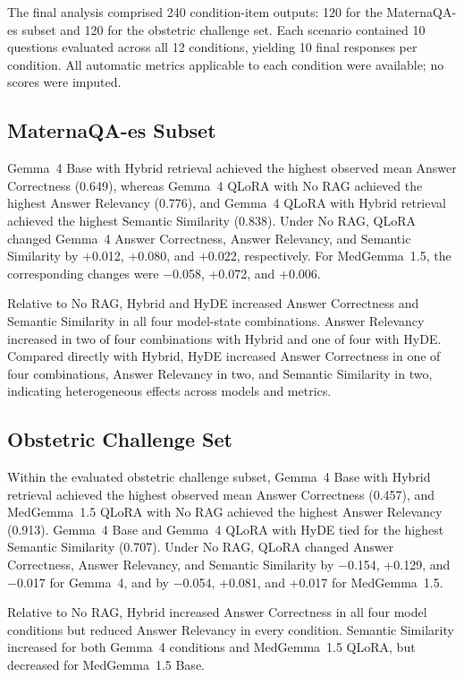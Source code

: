 The final analysis comprised 240 condition-item outputs: 120 for the
MaternaQA-es subset and 120 for the obstetric challenge set. Each scenario
contained 10 questions evaluated across all 12 conditions, yielding 10 final
responses per condition. All automatic metrics applicable to each condition
were available; no scores were imputed.

\subsection{MaternaQA-es Subset}
Gemma~4 Base with Hybrid retrieval achieved the highest observed mean Answer
Correctness (0.649), whereas Gemma~4 QLoRA with No RAG achieved the highest
Answer Relevancy (0.776), and Gemma~4 QLoRA with Hybrid retrieval achieved the
highest Semantic Similarity (0.838). Under No RAG, QLoRA changed Gemma~4
Answer Correctness, Answer Relevancy, and Semantic Similarity by +0.012,
+0.080, and +0.022, respectively. For MedGemma~1.5, the corresponding changes
were $-$0.058, +0.072, and +0.006.

Relative to No RAG, Hybrid and HyDE increased Answer Correctness and Semantic
Similarity in all four model-state combinations. Answer Relevancy increased
in two of four combinations with Hybrid and one of four with HyDE. Compared
directly with Hybrid, HyDE increased Answer Correctness in one of four
combinations, Answer Relevancy in two, and Semantic Similarity in two,
indicating heterogeneous effects across models and metrics.

\subsection{Obstetric Challenge Set}
Within the evaluated obstetric challenge subset, Gemma~4 Base with Hybrid
retrieval achieved the highest observed mean Answer Correctness (0.457), and
MedGemma~1.5 QLoRA with No RAG achieved the highest Answer Relevancy (0.913).
Gemma~4 Base and Gemma~4 QLoRA with HyDE tied for the highest Semantic
Similarity (0.707). Under No RAG, QLoRA changed Answer Correctness, Answer
Relevancy, and Semantic Similarity by $-$0.154, +0.129, and $-$0.017 for
Gemma~4, and by $-$0.054, +0.081, and +0.017 for MedGemma~1.5.

Relative to No RAG, Hybrid increased Answer Correctness in all four model
conditions but reduced Answer Relevancy in every condition. Semantic
Similarity increased for both Gemma~4 conditions and MedGemma~1.5 QLoRA, but
decreased for MedGemma~1.5 Base.

